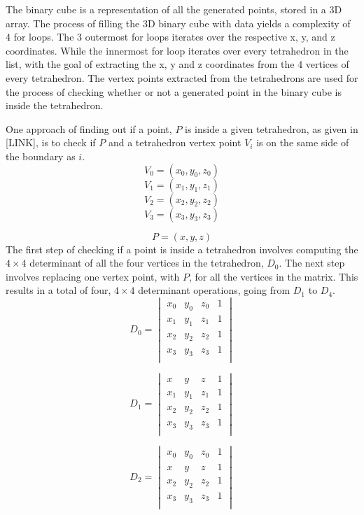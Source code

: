 The binary cube is a representation of all the generated points, stored in a 3D array. The process of filling the 3D binary cube with data yields a complexity of 4 for loops. The 3 outermost for loops iterates over the respective x, y, and z coordinates. While the innermost for loop iterates over every tetrahedron in the list, with the goal of extracting the x, y and z coordinates from the 4 vertices of every tetrahedron. The vertex points extracted from the tetrahedrons are used for the process of checking whether or not a generated point in the binary cube is inside the tetrahedron.

One approach of finding out if a point, \(P\) is inside a given tetrahedron, as given in [LINK], is to check if \(P\) and a tetrahedron vertex point \( V_{i}\) is on the same side of the boundary as \( i\). 
\[
V_{0} = (x_{0}, y_{0}, z_{0}) 
\]
\[
V_{1} = (x_{1}, y_{1}, z_{1})
\]
\[
V_{2} = (x_{2}, y_{2}, z_{2})
\]
\[
V_{3} = (x_{3}, y_{3}, z_{3})
\]

\[
P = (x, y, z)
\]
The first step of checking if a point is inside a tetrahedron involves computing the \(4 \times 4\) determinant of all the four vertices in the tetrahedron,  \(D_{0}\). The next step involves replacing one vertex point, with  \(P\), for all the vertices in the matrix. This results in a total of four, \(4 \times 4\) determinant operations, going from \(D_{1}\) to \(D_{4}\). 
\[
D_{0} =
\begin{vmatrix}
x_{0} & y_{0} & z_{0} & 1 \\ 
x_{1} & y_{1} & z_{1} & 1 \\ 
x_{2} & y_{2} & z_{2} & 1 \\ 
x_{3} & y_{3} & z_{3} & 1 \\ 
\end{vmatrix}
\]

\[
D_{1} =
\begin{vmatrix}
x & y & z & 1 \\ 
x_{1} & y_{1} & z_{1} & 1 \\ 
x_{2} & y_{2} & z_{2} & 1 \\ 
x_{3} & y_{3} & z_{3} & 1 \\ 
\end{vmatrix}
\]

\[
D_{2} =
\begin{vmatrix}
x_{0} & y_{0} & z_{0} & 1 \\ 
x & y & z & 1 \\ 
x_{2} & y_{2} & z_{2} & 1 \\ 
x_{3} & y_{3} & z_{3} & 1 \\ 
\end{vmatrix}
\]


